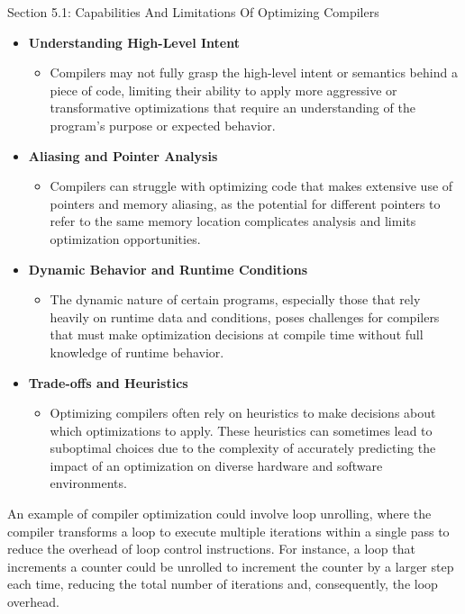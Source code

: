 \begin{notes}{Section 5.1: Capabilities And Limitations Of Optimizing Compilers}
    \begin{itemize}
        \item \textbf{Understanding High-Level Intent}
        \begin{itemize}
            \item Compilers may not fully grasp the high-level intent or semantics behind a piece of code, limiting their ability to apply more aggressive or transformative optimizations that require 
            an understanding of the program's purpose or expected behavior.
        \end{itemize}
        \item \textbf{Aliasing and Pointer Analysis}
        \begin{itemize}
            \item Compilers can struggle with optimizing code that makes extensive use of pointers and memory aliasing, as the potential for different pointers to refer to the same memory location 
            complicates analysis and limits optimization opportunities.
        \end{itemize}
        \item \textbf{Dynamic Behavior and Runtime Conditions}
        \begin{itemize}
            \item The dynamic nature of certain programs, especially those that rely heavily on runtime data and conditions, poses challenges for compilers that must make optimization decisions at 
            compile time without full knowledge of runtime behavior.
        \end{itemize}
        \item \textbf{Trade-offs and Heuristics}
        \begin{itemize}
            \item Optimizing compilers often rely on heuristics to make decisions about which optimizations to apply. These heuristics can sometimes lead to suboptimal choices due to the complexity 
            of accurately predicting the impact of an optimization on diverse hardware and software environments.
        \end{itemize}
    \end{itemize}
    
    \begin{highlight}
        An example of compiler optimization could involve loop unrolling, where the compiler transforms a loop to execute multiple iterations within a single pass to reduce the overhead of loop control 
        instructions. For instance, a loop that increments a counter could be unrolled to increment the counter by a larger step each time, reducing the total number of iterations and, consequently, 
        the loop overhead.
    

\end{highlight}
\end{notes}
